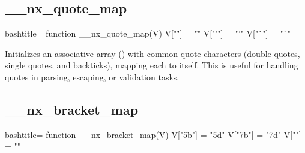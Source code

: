 \subsection{__nx_quote_map}
\label{__nx_quote_map}
\begin{NexCodeBox}{bash}{title={}}
	function __nx_quote_map(V) {
		V["\""] = "\""
		V["'"] = "'"
		V["`"] = "`"
	}
\end{NexCodeBox}

\begin{NexMainBox}
	\begin{NexMainBox}
		Initializes an associative array () with common quote characters (double quotes, single quotes, and backticks), mapping each to itself. This is useful for handling quotes in parsing, escaping, or validation tasks.
	\end{NexMainBox}
	\begin{NexMainBox}
		\begin{NexListDark}
		\end{NexListDark}
	\end{NexMainBox}
\end{NexMainBox}

\newpage
\subsection{__nx_bracket_map}
\label{__nx_bracket_map}
\begin{NexCodeBox}{bash}{title={}}
function __nx_bracket_map(V) {
	V["\x5b"] = "\x5d"
	V["\x7b"] = "\x7d"
	V[""] = ""
}
\end{NexCodeBox}

